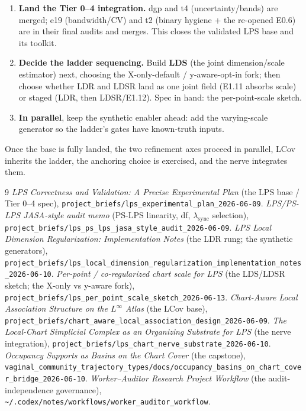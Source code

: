 \documentclass[11pt]{article}
\begin{document}
\begin{enumerate}[leftmargin=1.6em]
\item \textbf{Land the Tier 0--4 integration.} dgp and t4 (uncertainty/bands) are
merged; e19 (bandwidth/CV) and t2 (binary hygiene + the re-opened E0.6) are in their
final audits and merges. This closes the validated LPS base and its toolkit.
\item \textbf{Decide the ladder sequencing.} Build \textbf{LDS} (the joint
dimension/scale estimator) next, choosing the X-only-default / y-aware-opt-in fork;
then choose whether LDR and LDSR land as one joint field (E1.11 absorbs scale) or
staged (LDR, then LDSR/E1.12). Spec in hand: the per-point-scale sketch.
\item \textbf{In parallel}, keep the synthetic enabler ahead: add the varying-scale
generator so the ladder's gates have known-truth inputs.
\end{enumerate}

Once the base is fully landed, the two refinement axes proceed in parallel, LCov
inherits the ladder, the anchoring choice is exercised, and the nerve integrates
them.

\begin{thebibliography}{9}\small
{} \emph{LPS Correctness and Validation: A Precise Experimental Plan}
  (the LPS base / Tier 0--4 spec),
  \nolinkurl{project_briefs/lps_experimental_plan_2026-06-09}.
 \emph{LPS/PS-LPS JASA-style audit memo} (PS-LPS linearity, df,
  $\lambda_{\mathrm{sync}}$ selection),
  \nolinkurl{project_briefs/lps_ps_lps_jasa_style_audit_2026-06-09}.
 \emph{LPS Local Dimension Regularization: Implementation Notes}
  (the LDR rung; the synthetic generators),
  \nolinkurl{project_briefs/lps_local_dimension_regularization_implementation_notes_2026-06-10}.
 \emph{Per-point / co-regularized chart scale for LPS} (the LDS/LDSR
  sketch; the X-only vs y-aware fork),
  \nolinkurl{project_briefs/lps_per_point_scale_sketch_2026-06-13}.
 \emph{Chart-Aware Local Association Structure on the
  $L^\infty$ Atlas} (the LCov base),
  \nolinkurl{project_briefs/chart_aware_local_association_design_2026-06-09}.
 \emph{The Local-Chart Simplicial Complex as an Organizing Substrate
  for LPS} (the nerve integration),
  \nolinkurl{project_briefs/lps_chart_nerve_substrate_2026-06-10}.
 \emph{Occupancy Supports as Basins on the Chart Cover} (the
  capstone),
  \nolinkurl{vaginal_community_trajectory_types/docs/occupancy_basins_on_chart_cover_bridge_2026-06-10}.
 \emph{Worker--Auditor Research Project Workflow} (the
  audit-independence governance),
  \nolinkurl{~/.codex/notes/workflows/worker_auditor_workflow}.
\end{thebibliography}
\end{document}
